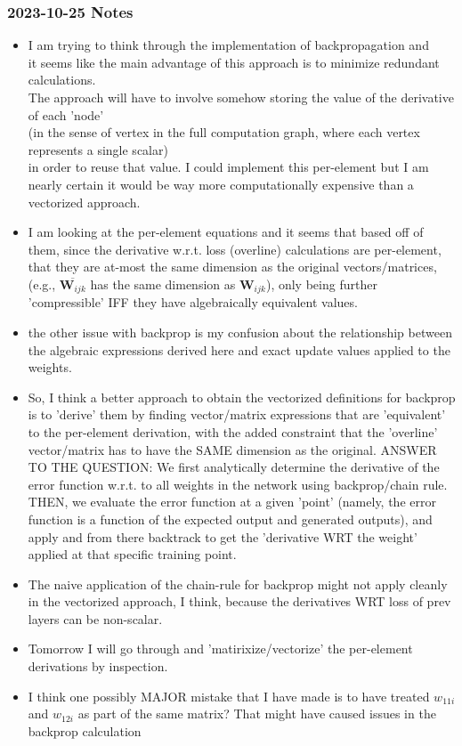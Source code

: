 \documentclass{article}
\begin{document}
\subsubsection{2023-10-25 Notes}
\begin{itemize}
    \item I am trying to think through the implementation of backpropagation and \\
    it seems like the main advantage of this approach is to minimize redundant calculations.\\
    The approach will have to involve somehow storing the value of the derivative of each 'node' \\
    (in the sense of vertex in the full computation graph, where each vertex represents a single scalar) \\
    in order to reuse that value. I could implement this per-element but I am nearly certain it would be way 
    more computationally expensive than a vectorized approach.
    \item I am looking at the per-element equations and it seems that based off of them, 
    since the derivative w.r.t. loss (overline) calculations are per-element, that they are at-most the same
    dimension as the original vectors/matrices, (e.g., $\overline{\bm{W}_{ijk}}$ has the same dimension as $\bm{W}_{ijk}$),
    only being further 'compressible' IFF they have algebraically equivalent values.
    \item the other issue with backprop is my confusion about the relationship between the algebraic expressions derived here and 
    exact update values applied to the weights. 
    \item So, I think a better approach to obtain the vectorized definitions for backprop is to 'derive' them
    by finding vector/matrix expressions that are 'equivalent' to the per-element derivation, with the added constraint 
    that the 'overline' vector/matrix has to have the SAME dimension as the original.
    ANSWER TO THE QUESTION: We first analytically determine the derivative of the error function w.r.t. to all weights in the network using backprop/chain rule.
    THEN, we evaluate the error function at a given 'point' (namely, the error function is a function of the expected output and generated outputs), and apply 
    and from there backtrack to get the 'derivative WRT the weight' applied at that specific training point. 
    \item The naive application of the chain-rule for backprop might not apply cleanly in the vectorized approach, I think,
    because the derivatives WRT loss of prev layers can be non-scalar.
    \item Tomorrow I will go through and 'matirixize/vectorize' the per-element derivations by inspection.
    \item I think one possibly MAJOR mistake that I have made is to have treated $w_{11i}$ and $w_{12i}$ as part of 
    the same matrix? That might have caused issues in the backprop calculation

\end{itemize}
\end{document}
